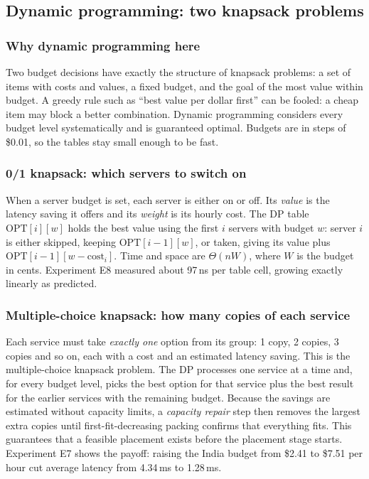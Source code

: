 \subsection{Dynamic programming: two knapsack problems}
\subsubsection{Why dynamic programming here}
Two budget decisions have exactly the structure of knapsack problems: a set of items with costs and values, a fixed budget, and the goal of the most value within budget. A greedy rule such as ``best value per dollar first'' can be fooled: a cheap item may block a better combination. Dynamic programming considers every budget level systematically and is guaranteed optimal. Budgets are in steps of \$0.01, so the tables stay small enough to be fast.

\subsubsection{0/1 knapsack: which servers to switch on}
When a server budget is set, each server is either on or off. Its \emph{value} is the latency saving it offers and its \emph{weight} is its hourly cost. The DP table \(\mathrm{OPT}[i][w]\) holds the best value using the first $i$ servers with budget $w$: server $i$ is either skipped, keeping \(\mathrm{OPT}[i-1][w]\), or taken, giving its value plus \(\mathrm{OPT}[i-1][w - \text{cost}_i]\). Time and space are $\Theta(nW)$, where $W$ is the budget in cents. Experiment E8 measured about 97\,ns per table cell, growing exactly linearly as predicted.

\subsubsection{Multiple-choice knapsack: how many copies of each service}
Each service must take \emph{exactly one} option from its group: 1 copy, 2 copies, 3 copies and so on, each with a cost and an estimated latency saving. This is the multiple-choice knapsack problem. The DP processes one service at a time and, for every budget level, picks the best option for that service plus the best result for the earlier services with the remaining budget. Because the savings are estimated without capacity limits, a \emph{capacity repair} step then removes the largest extra copies until first-fit-decreasing packing confirms that everything fits. This guarantees that a feasible placement exists before the placement stage starts. Experiment E7 shows the payoff: raising the India budget from \$2.41 to \$7.51 per hour cut average latency from 4.34\,ms to 1.28\,ms.

